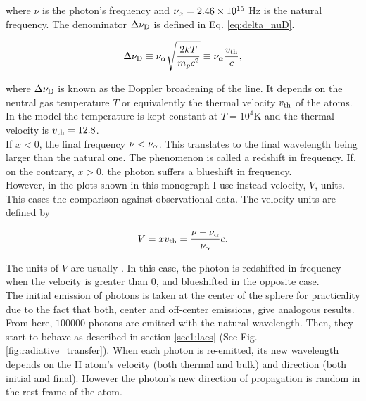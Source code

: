 \documentclass{latex/emulateapj}
\begin{document}
where $\nu$ is the photon's frequency and $\nu_{\rm \alpha} = 2.46\times 10^{15}$ Hz is the \lya natural frequency. The denominator $\Delta\nu_{\rm D}$ is defined in Eq. \ref{eq:delta_nuD}.

\begin{equation}
	\label{eq:delta_nuD}
	\Delta\nu_{\rm D} \equiv \nu_{\rm \alpha}\sqrt{\frac{2kT}{m_pc^2}} \equiv \nu_{\rm \alpha} \frac{v_{\rm th}}{c},
\end{equation} 

where $\Delta\nu_{\rm D}$ is known as the Doppler broadening of the \lya line. It depends on the neutral gas temperature $T$ or equivalently the thermal velocity $v_{\rm th}$ of the atoms. In the model the temperature is kept constant at $T=10^4$K and the thermal velocity is $v_{\rm th}=12.8$\kms. \\

If $x < 0$, the final frequency $\nu < \nu_{\rm \alpha}$. This translates to the final wavelength being larger than the \lya natural one. The phenomenon is called a redshift in frequency. If, on the contrary, $x > 0$, the photon suffers a blueshift in frequency. \\

However, in the plots shown in this monograph I use instead velocity, $V$, units. This eases the comparison against observational data. The velocity units are defined by

\begin{equation}
	\label{eq:V}
	V = xv_{\rm th} = \frac{\nu -\nu_{\rm \alpha}}{\nu_{\rm \alpha}}c.
\end{equation}

The units of $V$ are usually \kms. In this case, the photon is redshifted in frequency when the velocity is greater than 0, and blueshifted in the opposite case. \\

The initial emission of photons is taken at the center of the sphere for practicality due to the fact that both, center and off-center emissions, give analogous results. From here, $100000$ photons are emitted with the natural \lya wavelength. Then, they start to behave as described in section \ref{sec1:laes} (See Fig. \ref{fig:radiative_transfer}). When each photon is re-emitted, its new wavelength depends on the H atom's velocity (both thermal and bulk) and direction (both initial and final). However the photon's new direction of propagation is random in the rest frame of the atom. \\ 
\end{document}
